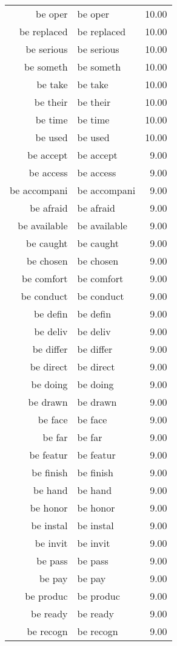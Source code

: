 \begin{table}[ht]
\begin{tabular}{rlr}
  be oper & be oper & 10.00 \\ 
  be replaced & be replaced & 10.00 \\ 
  be serious & be serious & 10.00 \\ 
  be someth & be someth & 10.00 \\ 
  be take & be take & 10.00 \\ 
  be their & be their & 10.00 \\ 
  be time & be time & 10.00 \\ 
  be used & be used & 10.00 \\ 
  be accept & be accept & 9.00 \\ 
  be access & be access & 9.00 \\ 
  be accompani & be accompani & 9.00 \\ 
  be afraid & be afraid & 9.00 \\ 
  be available & be available & 9.00 \\ 
  be caught & be caught & 9.00 \\ 
  be chosen & be chosen & 9.00 \\ 
  be comfort & be comfort & 9.00 \\ 
  be conduct & be conduct & 9.00 \\ 
  be defin & be defin & 9.00 \\ 
  be deliv & be deliv & 9.00 \\ 
  be differ & be differ & 9.00 \\ 
  be direct & be direct & 9.00 \\ 
  be doing & be doing & 9.00 \\ 
  be drawn & be drawn & 9.00 \\ 
  be face & be face & 9.00 \\ 
  be far & be far & 9.00 \\ 
  be featur & be featur & 9.00 \\ 
  be finish & be finish & 9.00 \\ 
  be hand & be hand & 9.00 \\ 
  be honor & be honor & 9.00 \\ 
  be instal & be instal & 9.00 \\ 
  be invit & be invit & 9.00 \\ 
  be pass & be pass & 9.00 \\ 
  be pay & be pay & 9.00 \\ 
  be produc & be produc & 9.00 \\ 
  be ready & be ready & 9.00 \\ 
  be recogn & be recogn & 9.00 \\ 

\end{tabular}
\end{table}
